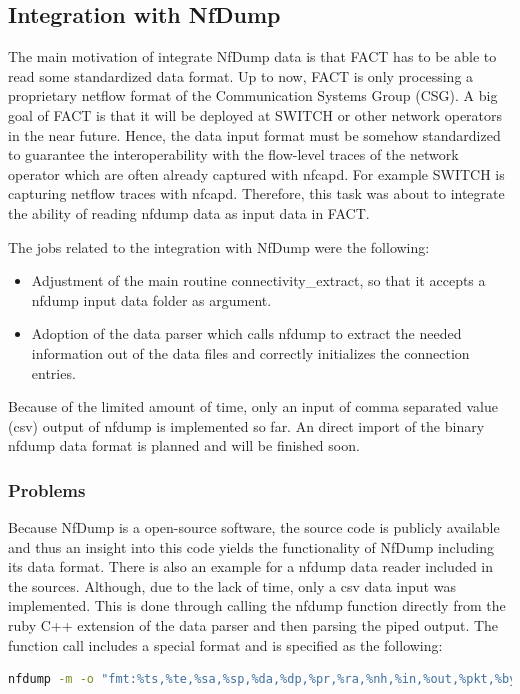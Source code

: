 \subsection{Integration with NfDump}
The main motivation of integrate NfDump data is that FACT has to be able to read some standardized data format. Up to now, FACT is only processing a proprietary netflow format of the Communication Systems Group (CSG). A big goal of FACT is that it will be deployed at SWITCH or other network operators in the near future. Hence, the data input format must be somehow standardized to guarantee the interoperability with the flow-level traces of the network operator which are often already captured with nfcapd. For example SWITCH is capturing netflow traces with nfcapd. Therefore, this task was about to integrate the ability of reading nfdump data as input data in FACT.

The jobs related to the integration with NfDump were the following:
\begin{itemize}
	\item Adjustment of the main routine connectivity\_extract, so that it accepts a nfdump input data folder as argument.
	\item Adoption of the data parser which calls nfdump to extract the needed information out of the data files and correctly initializes the connection entries.
\end{itemize}

Because of the limited amount of time, only an input of comma separated value (csv) output of nfdump is implemented so far. An direct import of the binary nfdump data format is planned and will be finished soon.

\subsubsection{Problems}
Because NfDump is a open-source software, the source code is publicly available and thus an insight into this code yields the functionality of NfDump including its data format. There is also an example for a nfdump data reader included in the sources. Although, due to the lack of time, only a csv data input was implemented. This is done through calling the nfdump function directly from the ruby C++ extension of the data parser and then parsing the piped output. The function call includes a special format and is specified as the following:

\begin{lstlisting}[caption=nfdump function call with special format specification for FACT csv input, language=sh]
	nfdump -m -o "fmt:%ts,%te,%sa,%sp,%da,%dp,%pr,%ra,%nh,%in,%out,%pkt,%byt" -r nfcapd_dir
\end{lstlisting}

